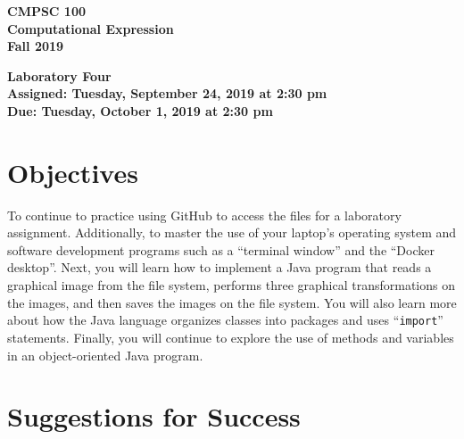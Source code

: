 \documentclass[11pt]{article}
\newcommand{\assignmentduedate}{October 1}
\newcommand{\assignmentassignedate}{September 24}
\newcommand{\assignmentnumber}{Four}
\newcommand{\labyear}{2019}
\newcommand{\labday}{Tuesday}
\newcommand{\labtime}{2:30 pm}
\newcommand{\assigneddate}{Assigned: \labday, \assignmentassignedate, \labyear{} at \labtime{}}
\newcommand{\duedate}{Due: \labday, \assignmentduedate, \labyear{} at \labtime{}}
\newcommand{\command}[1]{``\lstinline{#1}''}
\newcommand{\labtitle}[1]
{
  \begin{center}
    \begin{center}
      \bf
      CMPSC 100\\Computational Expression\\
      Fall 2019\\
      \medskip
    \end{center}
    \bf
    #1
  \end{center}
}
\begin{document}
\thispagestyle{empty}

\labtitle{Laboratory \assignmentnumber{} \\ \assigneddate{} \\ \duedate{}}

\section*{Objectives}


To continue to practice using GitHub to access the files for a laboratory
assignment. Additionally, to master the use of your laptop's operating system
and software development programs such as a ``terminal window'' and the ``Docker
desktop''. Next, you will learn how to implement a Java program that reads a
graphical image from the file system, performs three graphical transformations
on the images, and then saves the images on the file system. You will also learn
more about how the Java language organizes classes into packages and uses
\command{import} statements.
%
Finally, you will continue to explore the use of methods and variables in an
object-oriented Java program.

\section*{Suggestions for Success}
\end{document}
